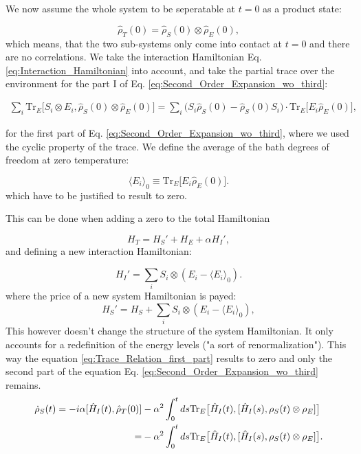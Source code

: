 We now assume the whole system to be seperatable at $ t = 0 $ as a product state:

\begin{equation}
	\hat{\rho}_T(0) = \hat{\rho}_S(0) \otimes \hat{\rho}_E(0),
	\label{eq:Initial_Product_State}
\end{equation}
which means, that the two sub-systems only come into contact at $ t = 0 $ and there are no correlations.
We take the interaction Hamiltonian Eq. \eqref{eq:Interaction_Hamiltonian} into account, 
and take the partial trace over the environment for the part I of Eq. \eqref{eq:Second_Order_Expansion_wo_third}:

\begin{align}
	\sum_i \mathrm{Tr}_E\big[ S_i \otimes E_i , \hat{\rho}_S(0) \otimes \hat{\rho}_E(0)\big] 
	= \sum_i \big(S_i \hat{\rho}_S(0) - \hat{\rho}_S(0) S_i\big) \cdot \mathrm{Tr}_E \big[E_i \hat{\rho}_E(0)\big],
	\label{eq:Trace_Relation_first_part}
\end{align}

for the first part of Eq. \eqref{eq:Second_Order_Expansion_wo_third}, where we used the cyclic property of the trace.
We define the average of the bath degrees of freedom at zero temperature:

\begin{equation}
	\langle E_i \rangle_0 \equiv \mathrm{Tr}_E \big[E_i \hat{\rho}_E(0)\big].
	\label{eq:Environment_Expectation_Value}
\end{equation}
which have to be justified to result to zero. 

This can be done when adding a zero to the total Hamiltonian

\begin{equation}
	H_T = H_S' + H_E + \alpha H_I',
	\label{eq:Shifted_Total_Hamiltonian}
\end{equation}
and defining a new interaction Hamiltonian:

\begin{equation}
	H_I' = \sum_i S_i \otimes (E_i - \langle E_i \rangle_0).
	\label{eq:Shifted_Interaction_Hamiltonian}
\end{equation}
where the price of a new system Hamiltonian is payed:
\begin{equation}
	H_S' = H_S + \sum_i S_i \otimes (E_i - \langle E_i \rangle_0),
	\label{eq:Shifted_System_Hamiltonian}
\end{equation}
This however doesn't change the structure of the system Hamiltonian.
It only accounts for a redefinition of the energy levels ("a sort of renormalization").
This way the equation \eqref{eq:Trace_Relation_first_part} results to zero and only the second part of the equation Eq. \eqref{eq:Second_Order_Expansion_wo_third} remains.
\begin{align}
	\dot{\rho}_S(t) = -i \alpha [\hat{H}_I(t),\hat{\rho}_T(0)]
	&- \alpha^2 \int_0^t ds \mathrm{Tr}_E \big[\hat{H}_I(t), [\hat{H}_I(s), \rho_S(t) \otimes \rho_E]\big] \notag \\
	= &- \alpha^2 \int_0^t ds \mathrm{Tr}_E \big[\hat{H}_I(t), [\hat{H}_I(s), \rho_S(t) \otimes \rho_E]\big].
	\label{eq:Partial_Trace_Derivation}
\end{align}

